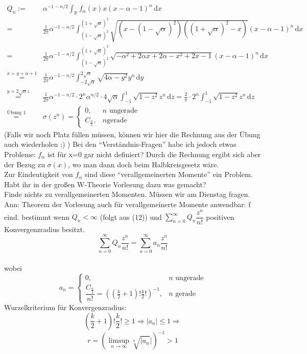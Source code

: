 \documentclass[a4paper, 11pt]{scrreprt}
\newcommand{\RR}{\mathbb{R}}
\begin{document}
\begin{align*}
	Q_n :=& \alpha^{-1-n/2}\int_{\RR} f_{\alpha}(x)x(x-\alpha -1)^n\,\mathrm{d}x \\
	 =& \frac{1}{2\pi}\alpha^{-1-n/2} \int_{(1-\sqrt{\alpha})^2}^{(1+\sqrt{\alpha})^2} \sqrt{(x-(1-\sqrt{\alpha})^2)((1+\sqrt{\alpha})^2-x)} (x-\alpha -1)^n \,\mathrm{d}x\\
	=& \frac{1}{2\pi}\alpha^{-1-n/2} \int_{(1-\sqrt{\alpha})^2}^{(1+\sqrt{\alpha})^2} \sqrt{-\alpha^2+2\alpha x+2\alpha -x^2+2x-1}(x-\alpha-1)^n \,\mathrm{d}x\\
	\overset{x=y+\alpha+1}{=}& \frac{1}{2\pi}\alpha^{-1-n/2} \int_{-2\sqrt{\alpha}}^{2\sqrt{\alpha}} \sqrt{4\alpha -y^2} y^n \,\mathrm{d}y\\
	\overset{y=2\sqrt{\alpha}z}{=}& \frac{1}{2\pi}\alpha^{-1-n/2} \cdot 2^n \alpha^{n/2}\cdot4\sqrt{\alpha}\int_{-1}^{1} \sqrt{1-z^2}z^n \,\mathrm{d}z = \frac{2}{\pi} \cdot 2^n\int_{-1}^{1} \sqrt{1-z^2}z^n\,\mathrm{d}z \\
	\overset{\text{Übung 1}}{=}& \sigma(z^n) = \begin{cases} 0, &n\text{ ungerade}\\
	C_{\frac n 2}, &n\text{gerade} \end{cases}
\end{align*}
(Falls wir noch Platz füllen müssen, können wir hier die Rechnung aus der Übung auch wiederholen ;) )
Bei den "`Verständnis-Fragen"' habe ich jedoch etwas Probleme: \(f_{\alpha}\) ist für x=0 gar nicht definiert? Durch die Rechnung ergibt sich aber der Bezug zu \(\sigma(x)\), wo man dann doch beim Halbkreisgesetz wäre.\\
Zur Eindeutigkeit von \(f_{\alpha}\) sind diese "`verallgemeinerten Momente"' ein Problem. Habt ihr in der großen W-Theorie Vorlesung dazu was gemacht?\\

Finde nichts zu verallgemeinerten Momenten. Müssen wir am Dienstag fragen.\\
Ann: Theorem der Vorlesung auch für verallgemeinerte Momente anwendbar: f eind. bestimmt wenn $ Q_n< \infty $ (folgt aus (12)) und $ \sum_{n=0}^{\infty} Q_n \dfrac{z^n}{n!}$ positiven Konvergenzradius besitzt.\\
\[ \sum_{n=0}^{\infty} Q_n \dfrac{z^n}{n!}= \sum_{n=0}^{\infty} a_n \dfrac{z^n}{n!}\]\\
wobei \[ a_n=\begin{cases} 0, &n\text{ ungerade}\\
	\dfrac{C_{\frac n 2}}{n!}=((\frac{k}{2}+1)!\frac{k}{2}!)^{-1}, &n\text{ gerade} \end{cases} \]
	Wurzelkriterium für Konvergenzradius: 
	\[(\frac{k}{2}+1)!\frac{k}{2}! \geq 1 \Rightarrow \vert a_n \vert \leq 1 \Rightarrow \]
	\[ r=(\limsup_{n \to \infty} \sqrt[n]{\vert a_n} \vert )^{-1} >1 \]
	
\end{document}

